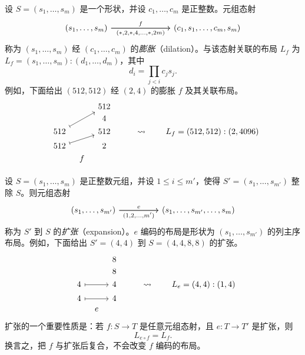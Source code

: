 \begin{example}[膨胀] \label{definitionofscaling} 设 $S = (s_1,\dots,s_m)$ 是一个形状，并设 $c_1,\dots,c_m$ 是正整数。元组态射
\[\begin{tikzcd} (s_1,\dots,s_m) \ar[rrr,"f"] \ar[rrr,swap,"(*{,}2{,}*{,}4{,}\dots{,}*{,}2m)"] & & &  (c_1,s_1,\dots,c_m,s_m)
    \end{tikzcd} \]
称为 $(s_1,\dots,s_m)$ 经 $(c_1,\dots, c_m)$ 的{\it 膨胀}（dilation）。与该态射关联的布局 $L_f$ 为 $L_f = (s_1,\dots,s_m):(d_1,\dots,d_m)$，其中
\[
d_i = \prod_{j < i} c_js_j.
\]
例如，下面给出 $(512,512)$ 经 $(2,4)$ 的膨胀 $f$ 及其关联布局。
    \[
    \begin{tikzcd}[row sep = 1, column sep = 8]
    &  & & 512 & & & & &  \\
    &  & & 4 & & & & & \\
    & 512 \ar[rruu,mapsto] & & 512 & & & \rightsquigarrow & & L_f = (512,512):(2,4096)\\
    & 512 \ar[rru,mapsto] & & 2 & & & & & \\
        & & f & & & & & & \\
    \end{tikzcd}
    \]
\end{example}

\begin{example}[扩张] \label{definitionofcodomainexpansion} 设 $S = (s_1,\dots,s_m)$ 是正整数元组，并设 $1 \leq i \leq m'$，使得 $S' = (s_1,\dots,s_{m'})$ 整除 $S$。则元组态射
\[\begin{tikzcd} (s_1,\dots,s_{m'}) \ar[rr,"e"] \ar[rr,swap,"(1{,}2{,}\dots{,}m')"] & &  (s_1,\dots,s_{m'},\dots,s_m)
    \end{tikzcd} \]
称为 $S'$ 到 $S$ 的{\it 扩张}（expansion）。$e$ 编码的布局是形状为 $(s_1,\dots,s_{m'})$ 的列主序布局。例如，下面给出 $S' = (4,4)$ 到 $S = (4,4,8,8)$ 的扩张。
    \[
    \begin{tikzcd}[row sep = 1, column sep = 8]
    &  & & 8 & & & & &  \\
    &  & & 8 & & & & & \\
    & 4 \ar[rr,mapsto] & & 4 & & & \rightsquigarrow & & L_e = (4,4):(1,4)\\
    & 4 \ar[rr,mapsto] & & 4 & & & & & \\
        & & e & & & & & & \\
    \end{tikzcd}
    \]
扩张的一个重要性质是：若 $f:S \to T$ 是任意元组态射，且 $e: T \to T'$ 是扩张，则
\[
L_{e \circ f} = L_f.
\]
换言之，把 $f$ 与扩张后复合，不会改变 $f$ 编码的布局。
\end{example}


